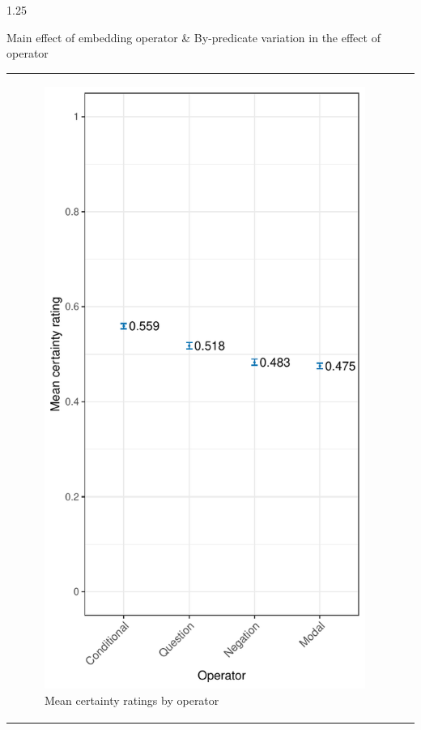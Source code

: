 \documentclass[final]{beamer}
\newlength{\colwidth}
\begin{document}
\begin{frame}[t]
\begin{columns}[t]
\begin{column}{1.25\colwidth}
\begin{normalbox}{Main effect of embedding operator \& By-predicate variation in the effect of operator}
\begin{tabular}{p{.70\linewidth} p{.3\linewidth}}
					\vspace{-1.25\baselineskip}
					\begin{figure}[h]
						\centering
						\includegraphics[width=.9\linewidth]{projective-op.pdf}
						\vspace{-\baselineskip}
						\caption{Mean certainty ratings by operator}
						\label{fig:figure2}
					\end{figure}
				\end{tabular}
				\vspace{-\baselineskip}

\end{normalbox}
\end{column}
\end{columns}
\end{frame}
\end{document}
